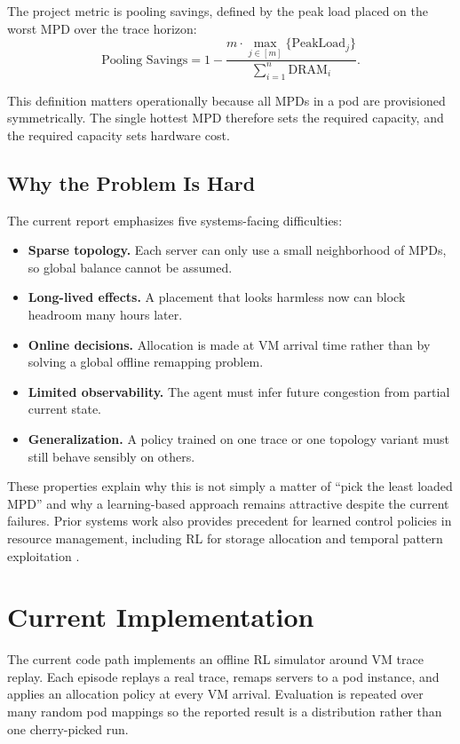 \documentclass[11pt]{article}
\theoremstyle{definition}
\begin{document}
The project metric is pooling savings, defined by the peak load placed on the
worst MPD over the trace horizon:
\begin{equation}
    \text{Pooling Savings}
    =
    1 -
    \frac{m \cdot \max_{j \in [m]}\{\text{PeakLoad}_j\}}
         {\sum_{i=1}^{n} \text{DRAM}_i}.
\end{equation}

This definition matters operationally because all MPDs in a pod are provisioned
symmetrically. The single hottest MPD therefore sets the required capacity, and
the required capacity sets hardware cost.

\subsection{Why the Problem Is Hard}

The current report emphasizes five systems-facing difficulties:
\begin{itemize}[nosep]
    \item \textbf{Sparse topology.} Each server can only use a small neighborhood
    of MPDs, so global balance cannot be assumed.
    \item \textbf{Long-lived effects.} A placement that looks harmless now can
    block headroom many hours later.
    \item \textbf{Online decisions.} Allocation is made at VM arrival time rather
    than by solving a global offline remapping problem.
    \item \textbf{Limited observability.} The agent must infer future congestion
    from partial current state.
    \item \textbf{Generalization.} A policy trained on one trace or one topology
    variant must still behave sensibly on others.
\end{itemize}

These properties explain why this is not simply a matter of ``pick the least
loaded MPD'' and why a learning-based approach remains attractive despite the
current failures. Prior systems work also provides precedent for learned control
policies in resource management, including RL for storage allocation and temporal
pattern exploitation \cite{fleetio2025,coach2025}.

\section{Current Implementation}

The current code path implements an offline RL simulator around VM trace replay.
Each episode replays a real trace, remaps servers to a pod instance, and applies
an allocation policy at every VM arrival. Evaluation is repeated over many random
pod mappings so the reported result is a distribution rather than one
cherry-picked run.
\end{document}
